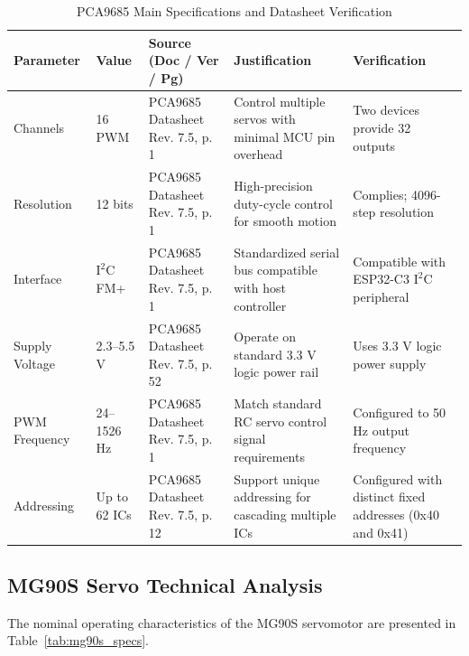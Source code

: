 \documentclass[lettersize,journal]{IEEEtran}
\begin{document}
	\begin{table}[!t]
		\centering
		\caption{PCA9685 Main Specifications and Datasheet Verification \cite{pca9685}}
		\label{tab:pca9685_specs}
		\scriptsize
		
		\setlength{\tabcolsep}{2pt}
		\renewcommand{\arraystretch}{1.1}
		
		\begin{tabularx}{\columnwidth}{@{}P{1.5cm} P{1.4cm} P{2.2cm} X X@{}}
			\toprule
			\textbf{Parameter} & \textbf{Value} & \textbf{Source (Doc / Ver / Pg)} & \textbf{Justification} & \textbf{Verification} \\
			\midrule
			
			Channels & 
			16 PWM & 
			PCA9685 Datasheet Rev. 7.5, p. 1 & 
			Control multiple servos with minimal MCU pin overhead & 
			Two devices provide 32 outputs \\
			
			Resolution & 
			12 bits & 
			PCA9685 Datasheet Rev. 7.5, p. 1 & 
			High-precision duty-cycle control for smooth motion & 
			Complies; 4096-step resolution \\
			
			Interface & 
			$\text{I}^2\text{C}$ FM+ & 
			PCA9685 Datasheet Rev. 7.5, p. 1 & 
			Standardized serial bus compatible with host controller & 
			Compatible with ESP32-C3 $\text{I}^2\text{C}$ peripheral \\
			
			Supply Voltage & 
			2.3--5.5 V & 
			PCA9685 Datasheet Rev. 7.5, p. 52 & 
			Operate on standard 3.3 V logic power rail & 
			Uses 3.3 V logic power supply \\
			
			PWM Frequency & 
			24--1526 Hz & 
			PCA9685 Datasheet Rev. 7.5, p. 1 & 
			Match standard RC servo control signal requirements & 
			Configured to 50 Hz output frequency \\
			
			Addressing & 
			Up to 62 ICs & 
			PCA9685 Datasheet Rev. 7.5, p. 12 & 
			Support unique addressing for cascading multiple ICs & 
			Configured with distinct fixed addresses (0x40 and 0x41) \\
			
			\bottomrule
		\end{tabularx}
	\end{table}
	
	
	
	\subsection{MG90S Servo Technical Analysis}
	The nominal operating characteristics of the MG90S servomotor are presented in Table~\ref{tab:mg90s_specs}.
	
\end{document}
